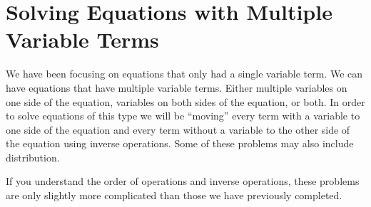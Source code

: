 \section{Solving Equations with Multiple Variable Terms}
We have been focusing on equations that only had a single variable term. We can have equations that have multiple variable terms. Either multiple variables on one side of the equation, variables on both sides of the equation, or both. In order to solve equations of this type we will be ``moving'' every term with a variable to one side of the equation and every term without a variable to the other side of the equation using inverse operations. Some of these problems may also include distribution.

If you understand the order of operations and inverse operations, these problems are only slightly more complicated than those we have previously completed.
